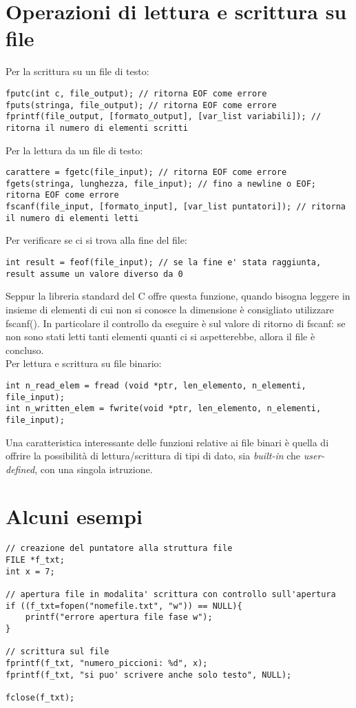 \section{Operazioni di lettura e scrittura su file}
Per la scrittura su un file di testo:
\begin{lstlisting}[title={Scrittura su file di testo}]
fputc(int c, file_output); // ritorna EOF come errore
fputs(stringa, file_output); // ritorna EOF come errore
fprintf(file_output, [formato_output], [var_list variabili]); // ritorna il numero di elementi scritti
\end{lstlisting}

Per la lettura da un file di testo:
\begin{lstlisting}[title={Lettura da file di testo}]
carattere = fgetc(file_input); // ritorna EOF come errore
fgets(stringa, lunghezza, file_input); // fino a newline o EOF; ritorna EOF come errore
fscanf(file_input, [formato_input], [var_list puntatori]); // ritorna il numero di elementi letti
\end{lstlisting}

Per verificare se ci si trova alla fine del file:
\begin{lstlisting}[title={Controllo fine file}]
int result = feof(file_input); // se la fine e' stata raggiunta, result assume un valore diverso da 0
\end{lstlisting}
Seppur la libreria standard del C offre questa funzione, quando bisogna leggere in insieme di elementi di cui non si conosce la dimensione è consigliato utilizzare \colorbox{light-gray}{fscanf()}. In particolare il controllo da eseguire è sul valore di ritorno di fscanf: se non sono stati letti tanti elementi quanti ci si aspetterebbe, allora il file è concluso.\\

Per lettura e scrittura su file binario:
\begin{lstlisting}[title={Controllo fine file}]
int n_read_elem = fread (void *ptr, len_elemento, n_elementi, file_input);
int n_written_elem = fwrite(void *ptr, len_elemento, n_elementi, file_input);
\end{lstlisting}
Una caratteristica interessante delle funzioni relative ai file binari è quella di offrire la possibilità di lettura/scrittura di tipi di dato, sia \textit{built-in} che \textit{user-defined}, con una singola istruzione.

\section{Alcuni esempi}
\begin{lstlisting}[title={Scrittura su file di testo}]
// creazione del puntatore alla struttura file
FILE *f_txt;
int x = 7;

// apertura file in modalita' scrittura con controllo sull'apertura
if ((f_txt=fopen("nomefile.txt", "w")) == NULL){
	printf("errore apertura file fase w");
}

// scrittura sul file
fprintf(f_txt, "numero_piccioni: %d", x);
fprintf(f_txt, "si puo' scrivere anche solo testo", NULL);

fclose(f_txt);
\end{lstlisting}

